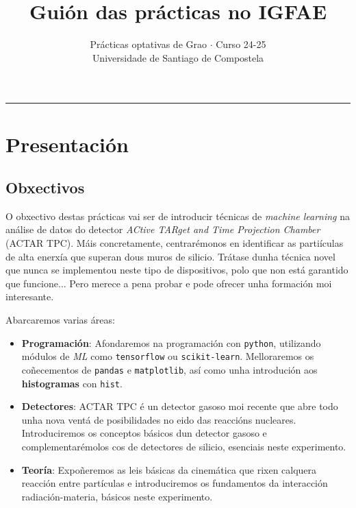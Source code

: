 \documentclass[11pt, a4paper]{article}
\title{\textbf{Guión das prácticas no IGFAE}}
\author{%
\small{Prácticas optativas de Grao $\cdot$ Curso 24-25}\\
\small{Universidade de Santiago de Compostela}}
\date{\empty}%
\begin{document}
\begin{minipage}{0.48\linewidth}
    \maketitle
\end{minipage}\hfill
\begin{minipage}{0.48\linewidth}
    \tableofcontents
\end{minipage}

\noindent\rule{\textwidth}{1pt}
\section{Presentación}
\subsection{Obxectivos}
O obxectivo destas prácticas vai ser de introducir técnicas de \textit{machine learning} na análise de datos do detector \textit{ACtive TARget and Time Projection Chamber} (ACTAR TPC). Máis concretamente, centrarémonos en identificar as partiículas de alta enerxía que superan dous muros de silicio. Trátase dunha técnica novel que nunca se implementou neste tipo de dispositivos, polo que non está garantido que funcione... Pero merece a pena probar e pode ofrecer unha formación moi interesante.

Abarcaremos varias áreas:
\begin{itemize}
    \item \textbf{Programación}: Afondaremos na programación con \verb|python|, utilizando módulos de \textit{ML} como \verb|tensorflow| ou \texttt{scikit-learn}. Melloraremos os coñecementos de \verb|pandas| e \verb|matplotlib|, así como unha introdución aos \textbf{histogramas} con \verb|hist|.

    \item \textbf{Detectores}: ACTAR TPC é un detector gasoso moi recente que abre todo unha nova ventá de posibilidades no eido das reaccións nucleares. Introduciremos os conceptos básicos dun detector gasoso e complementarémolos cos de detectores de silicio, esenciais neste experimento.

    \item \textbf{Teoría}: Expoñeremos as leis básicas da cinemática que rixen calquera reacción entre partículas e introduciremos os fundamentos da interacción radiación-materia, básicos neste experimento.
\end{itemize}
\end{document}
